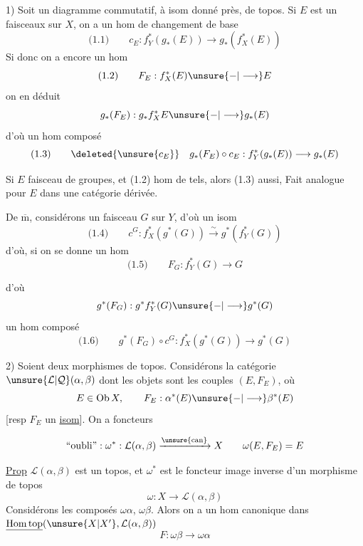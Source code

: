 1) Soit
un diagramme commutatif, à isom donné près, de topos. Si $E$ est un  faisceaux   sur $X$, on a  un hom de changement de base
\[
\text{(1.1)}\qquad c_E:f_Y^*(g_*(E))\longrightarrow g_*(f_X^*(E))
\]
Si donc on a encore un hom
\[
\text{(1.2)}\qquad F_E:f_X^*(E)\unsure{-|\longrightarrow}E
\]
on en déduit
\[
g_*(F_E):g_*f_X^*E\unsure{-|\longrightarrow}g_*(E)
\]
d'où un hom composé
\[
\text{(1.3)}\qquad\deleted{\unsure{c_E}}\quad g_*(F_E)\circ c_E:f_Y^*(g_*(E))\longrightarrow g_*(E)
\]

Si $E$ faisceau de groupes, et (1.2) hom de tels, alors (1.3) aussi,  Fait analogue pour $E$ dans une catégorie dérivée.

De $\overline{\mathrm m}$, considérons un faisceau $G$ sur $Y$, d'où un isom
\[
\text{(1.4)}\qquad c^G:f_X^*(g^*(G))\xrightarrow{\sim}g^*(f_Y^*(G))
\]
d'où, si on se donne un hom
\[
\text{(1.5)}\qquad F_G:f_Y^*(G)\longrightarrow G
\]


d'où
\[
g^*(F_G):g^*f_Y^*(G)\unsure{-|\longrightarrow}g^*(G)
\]
un hom composé
\[
\text{(1.6)}\qquad g^*(F_G)\circ c^G:f_X^*(g^*(G))\longrightarrow g^*(G)
\]

2) Soient
deux morphismes de topos.  Considérons la catégorie $\unsure{\mathcal L|\mathcal Q}(\alpha,\beta)$ dont les objets sont les couples $(E,F_E)$, où 
\[
E\in\operatorname{Ob}X,\qquad F_E:\alpha^*(E)\unsure{-|\longrightarrow}\beta^*(E)
\]
[resp $F_E$ un \uline{isom}]. On a  foncteurs

\[
\text{``oubli''}:\omega^*:\mathcal L(\alpha,\beta)\xrightarrow{\unsure{\mathrm{can}}}X
\qquad\omega(E,F_E)=E
\]

\margin{$\big|$}
\uline{Prop} $\mathcal L(\alpha,\beta)$ est un topos, et $\omega^*$ est le foncteur image inverse d'un morphisme de topos
\[
\omega:X\longrightarrow\mathcal L(\alpha,\beta)
\]
\margin{$\big|$}
Considérons les composés $\omega\alpha$, $\omega\beta$. Alors on a un hom canonique  dans $\underline{\operatorname{Hom}\mathrm{top}}(\unsure{X|X'},\mathcal L(\alpha,\beta))$
\[
F:\omega\beta\longrightarrow\omega\alpha
\]

